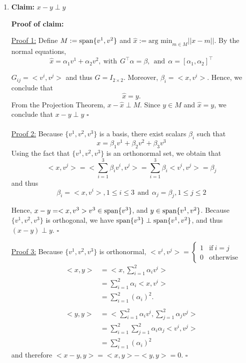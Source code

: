 \documentclass[letterpaper]{article}
\begin{document}
\begin{enumerate}
\setlength{\itemsep}{.15in}
\renewcommand{\labelenumi}{(\alph{enumi})}
\item \textbf{Claim:} $x-y \perp y$

\textbf{Proof of claim:}

\noindent \underline{Proof 1:}
Define $M := \textrm{span} \{ v^1, v^2 \}$ and $\hat{x} := \textrm{arg~min}_{m \in M} ||x-m||$.  By the normal equations,
$$\hat{x}= \alpha_1 v^1 + \alpha_2 v^2,~\text{with}~~ G^\top \alpha = \beta,~~\text{and} ~~\alpha = [\alpha_1, \alpha_2]^\top$$

$G_{ij}=<v^i,v^j>$ and thus $G=I_{2\times 2}$. Moreover, $\beta_i = <x,v^i>$. Hence, we conclude that
$$ \hat{x}=y.$$
From the Projection Theorem, $x-\hat{x} \perp M$. Since $y \in M$ and $\hat{x}=y$, we conclude that
$x-y \perp y$ \hfill $\square$ \\
\\

\noindent \underline{Proof 2:}
Because $\{v^1, v^2, v^3\}$ is a basis, there exist scalars $\beta_i$ such that
$$x=\beta_1 v^1 + \beta_2 v^2 + \beta_3 v^3$$
Using the fact that $\{v^1, v^2, v^3\}$ is an orthonormal set, we obtain that
$$<x,v^j> = <\sum_{i=1}^3 \beta_i v^i, v^j> = \sum_{i=1}^3 \beta_i< v^i, v^j> = \beta_j$$
and thus $$ \beta_i = <x,v^i>, 1\le i \le 3 ~~ \text{and}~~\alpha_j = \beta_j,  1 \le j \le 2$$

Hence, $x-y = <x,v^3>v^3 \in \textrm{span} \{ v^3 \}$, and $y \in \textrm{span} \{ v^1,v^2 \}$. Because $\{v^1, v^2, v^3\}$ is orthogonal, we have $\textrm{span} \{ v^3 \} \perp \textrm{span} \{ v^1,v^2 \} $, and thus $(x-y) \perp y$.  \hfill $\square$

\noindent \underline{Proof 3:}
Because $\{v^1, v^2, v^3\}$ is orthonormal, $<v^i,v^j>= \begin{cases} 1 & \text{if}~ i=j \\
0 & \text{otherwise} \end{cases}$
\begin{align*}
<x,y>&= <x,\sum_{i=1}^2 \alpha_i v^i>\\
&= \sum_{i=1}^2 \alpha_i <x,  v^i>\\
&= \sum_{i=1}^2 (\alpha_i)^2.\\
\\
<y,y>&= <\sum_{i=1}^2 \alpha_i v^i,\sum_{j=1}^2 \alpha_j v^j>\\
&= \sum_{i=1}^2 \sum_{j=1}^2 \alpha_i\alpha_j < v^i,v^j>\\
&=\sum_{i=1}^2 (\alpha_i)^2
\end{align*}
and therefore $<x-y,y>= <x,y>-<y,y>=0$. \hfill $\square$ \\



\end{enumerate}
\end{document}
